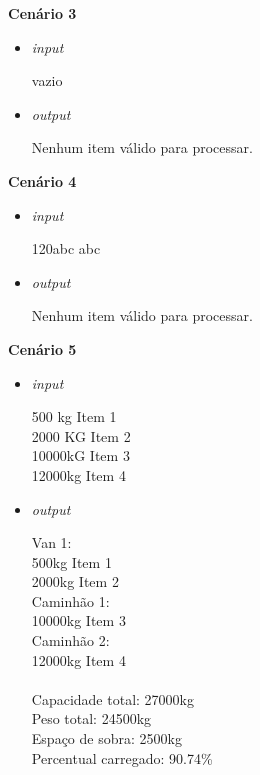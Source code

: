 \documentclass[english,brazilian]{UNISINOSartigo} %
\begin{document}
\textbf{Cenário 3}

\begin{itemize}[leftmargin=1cm, itemsep=0.1em, topsep=0.1em]
    \item \textit{input}
    \begin{itemize}[leftmargin=1.2cm, itemsep=0.1em, topsep=0.1em]
        vazio
    \end{itemize}
    \item \textit{output}
    \begin{itemize}[leftmargin=1.2cm, itemsep=0.1em, topsep=0.1em]
        Nenhum item válido para processar.
    \end{itemize}
\end{itemize}

\textbf{Cenário 4}

\begin{itemize}[leftmargin=1cm, itemsep=0.1em, topsep=0.1em]
    \item \textit{input}
    \begin{itemize}[leftmargin=1.2cm, itemsep=0.1em, topsep=0.1em]
        120abc abc
    \end{itemize}
    \item \textit{output}
    \begin{itemize}[leftmargin=1.2cm, itemsep=0.1em, topsep=0.1em]
        Nenhum item válido para processar.
    \end{itemize}
\end{itemize}

\textbf{Cenário 5}

\begin{itemize}[leftmargin=1cm, itemsep=0.1em, topsep=0.1em]
    \item \textit{input}
    \begin{itemize}[leftmargin=1.2cm, itemsep=0.1em, topsep=0.1em]
        500 kg Item 1\\
        2000 KG Item 2\\
        10000kG Item 3\\
        12000kg Item 4
    \end{itemize}
    \item \textit{output}
    \begin{itemize}[leftmargin=1.2cm, itemsep=0.1em, topsep=0.1em]
        Van 1:\\
        500kg Item 1\\
        2000kg Item 2\\
        Caminhão 1:\\
        10000kg Item 3\\
        Caminhão 2:\\
        12000kg Item 4\\

        \\Capacidade total: 27000kg\\
        Peso total: 24500kg\\
        Espaço de sobra: 2500kg\\
        Percentual carregado: 90.74\%
    \end{itemize}
\end{itemize}
\end{document}
